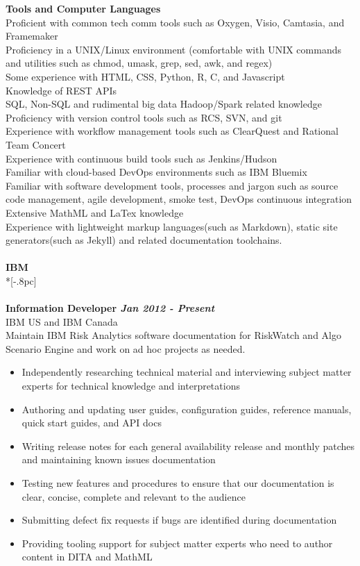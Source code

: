 \documentclass[11pt]{extarticle}
\begin{document}
{\bf Tools and Computer Languages} \\
Proficient with common tech comm tools such as Oxygen, Visio, Camtasia, and Framemaker\\
Proficiency in a UNIX/Linux environment (comfortable with UNIX commands and utilities such as chmod, umask, grep, sed, awk, and regex)\\
Some experience with HTML, CSS, Python, R, C, and Javascript \\
Knowledge of REST APIs\\
SQL, Non-SQL and rudimental big data Hadoop/Spark related knowledge\\
Proficiency with version control tools such as RCS, SVN, and git\\
Experience with workflow management tools such as ClearQuest and Rational Team Concert \\
Experience with continuous build tools such as Jenkins/Hudson \\
Familiar with cloud-based DevOps environments such as IBM Bluemix  \\
Familiar with software development tools, processes and jargon such as source code management, agile development, smoke test, DevOps continuous integration \\
Extensive MathML and LaTex knowledge\\
Experience with lightweight markup languages(such as Markdown), static site generators(such as Jekyll) and related documentation toolchains.\\
\\
{\large \bf IBM }  \\*[-.8pc]
\underline{\hspace{6.55in}} \\
\\
{\bf Information Developer \hfill \it Jan 2012 - Present}  \\
IBM US and IBM Canada \\
Maintain IBM Risk Analytics software documentation for RiskWatch and Algo Scenario Engine and work on ad hoc projects as needed. 
\begin{itemize} 
\setlength{\itemsep}{0pt}
\item Independently researching technical material and interviewing subject matter experts for technical knowledge and interpretations
  \item Authoring and updating user guides,  configuration guides, reference manuals, quick start guides, and API docs
  \item Writing release notes for each general availability release and monthly patches and maintaining known issues documentation 
  \item Testing new features and procedures to ensure that our documentation is clear, concise, complete and relevant to the audience
	\item Submitting defect fix requests if bugs are identified during documentation 
	\item Providing tooling support for subject matter experts who need to author content in DITA and MathML \\
\end{itemize}
\end{document}
